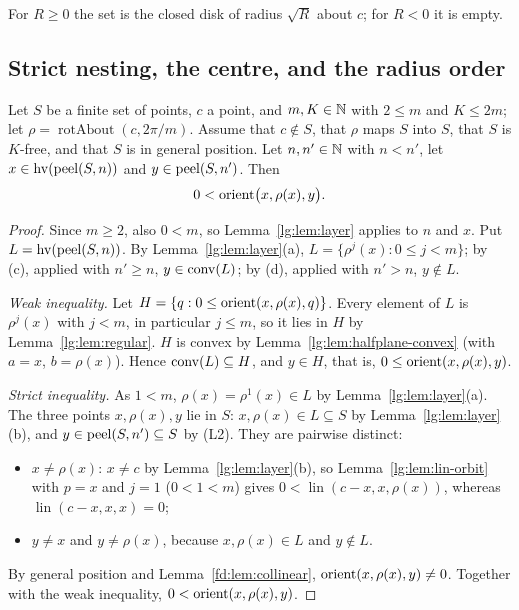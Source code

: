 For $R\ge0$ the set is the closed disk of radius $\sqrt R$ about $c$; for $R<0$ it is empty.

\subsection{Strict nesting, the centre, and the radius order}\label{lg:ssec:nest}

\begin{theorem}\label{lg:thm:nesting}
Let $S$ be a finite set of points, $c$ a point, and $m,K\in\mathbb N$ with $2\le m$ and $K\le 2m$; let
$\rho=\operatorname{rotAbout}(c,2\pi/m)$. Assume that $c\notin S$, that $\rho$ maps $S$ into $S$, that $S$ is $K$-free,
and that $S$ is in general position. Let $n,n'\in\mathbb N$ with $n<n'$, let $x\in\operatorname{hv}(\operatorname{peel}(S,n))$ and $y\in\operatorname{peel}(S,n')$. Then
\[
  0<\operatorname{orient}\bigl(x,\rho(x),y\bigr).
\]
\end{theorem}

\begin{proof}
Since $m\ge2$, also $0<m$, so Lemma~\ref{lg:lem:layer} applies to $n$ and $x$. Put $L=\operatorname{hv}(\operatorname{peel}(S,n))$. By
Lemma~\ref{lg:lem:layer}(a), $L=\{\rho^{j}(x):0\le j<m\}$; by (c), applied with $n'\ge n$, $y\in\operatorname{conv}(L)$; by (d),
applied with $n'>n$, $y\notin L$.

\emph{Weak inequality.} Let $H=\{q:0\le\operatorname{orient}(x,\rho(x),q)\}$. Every element of $L$ is $\rho^{j}(x)$ with $j<m$, in
particular $j\le m$, so it lies in $H$ by Lemma~\ref{lg:lem:regular}. $H$ is convex by
Lemma~\ref{lg:lem:halfplane-convex} (with $a=x$, $b=\rho(x)$). Hence $\operatorname{conv}(L)\subseteq H$, and $y\in H$, that is,
$0\le\operatorname{orient}(x,\rho(x),y)$.

\emph{Strict inequality.} As $1<m$, $\rho(x)=\rho^{1}(x)\in L$ by Lemma~\ref{lg:lem:layer}(a). The three points
$x,\rho(x),y$ lie in $S$: $x,\rho(x)\in L\subseteq S$ by Lemma~\ref{lg:lem:layer}(b), and $y\in\operatorname{peel}(S,n')\subseteq S$
by (L2). They are pairwise distinct:
\begin{itemize}
\item $x\ne\rho(x)$: $x\ne c$ by Lemma~\ref{lg:lem:layer}(b), so Lemma~\ref{lg:lem:lin-orbit} with $p=x$ and $j=1$
  ($0<1<m$) gives $0<\operatorname{lin}(c-x,x,\rho(x))$, whereas $\operatorname{lin}(c-x,x,x)=0$;
\item $y\ne x$ and $y\ne\rho(x)$, because $x,\rho(x)\in L$ and $y\notin L$.
\end{itemize}
By general position and Lemma~\ref{fd:lem:collinear}, $\operatorname{orient}(x,\rho(x),y)\ne0$. Together with the weak inequality,
$0<\operatorname{orient}(x,\rho(x),y)$.
\end{proof}

